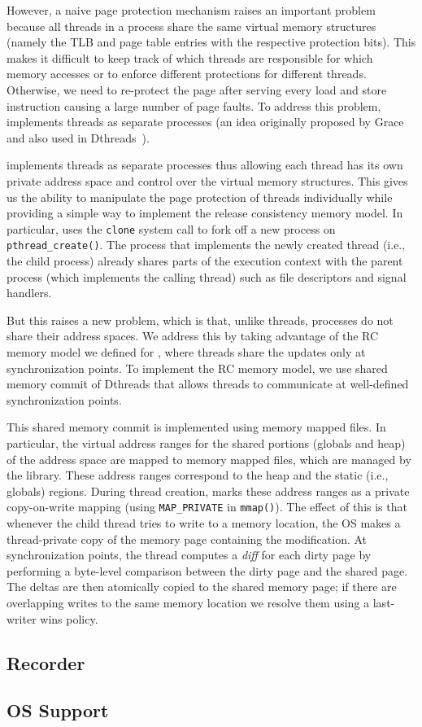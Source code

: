 However, a naive page protection mechanism raises an important problem because all threads in a process share the same virtual memory
structures (namely the TLB and page table entries with the respective protection bits). This makes it difficult to keep track of which
threads are responsible for which memory accesses or to enforce different protections for different threads. Otherwise, we need to re-protect the page after serving every load and store instruction causing a large number of page faults.
To address this problem, \projecttitle implements threads as separate
processes (an idea originally proposed by Grace~\cite{grace-oopsla-2009} and also used in Dthreads~\cite{dthreads-sosp-2011}).

 \projecttitle  implements threads as separate processes thus allowing each thread has its own private address space and control over the virtual
memory structures.   This gives us the ability to manipulate the page protection of threads individually while providing a simple way to implement the release consistency memory
model. In particular, \projecttitle uses the {\tt clone} system call to fork off a new process on {\tt pthread\_create()}. The process that implements the newly created thread (i.e., the child process) already
shares parts of the execution context with the parent process (which implements the calling thread) such as file descriptors and signal handlers.


But this raises a new problem, which is that, unlike threads, processes do not share their address spaces. We address this by taking advantage of the RC memory model we defined for \projecttitle, where threads share the updates only at synchronization points.  To implement the RC memory model, we use shared memory commit of Dthreads that allows threads to communicate at well-defined synchronization points.


 This shared memory commit is implemented using memory mapped files. In
particular, the virtual address ranges for the shared portions (globals and heap) of
the address space are mapped to memory mapped files, which are managed by the
\projecttitle library. These address ranges correspond to the heap and
the static (i.e., globals) regions.  During thread creation,
\projecttitle marks these address ranges as a private copy-on-write
mapping (using {\tt MAP\_PRIVATE} in {\tt mmap()}). The effect of this
is that whenever the child thread tries to write to a memory location,
the OS makes a thread-private copy of the memory page containing the
modification.  At synchronization points, the thread computes a {\em diff}
for each dirty page by performing a byte-level comparison between the
dirty page and the shared page. The deltas are then atomically
copied to the shared memory page; if there are overlapping writes
to the same memory location we resolve them using a last-writer wins policy.
\subsection{Recorder}

\subsection{OS Support}